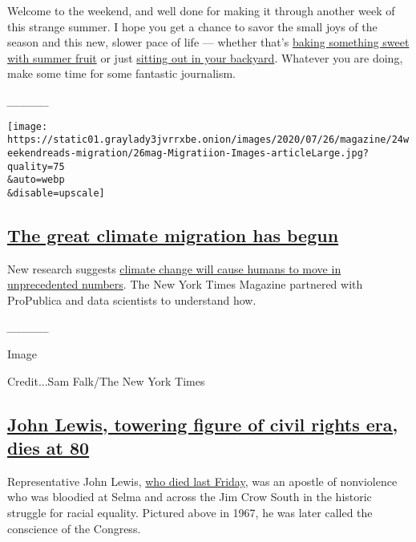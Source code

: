 Welcome to the weekend, and well done for making it through another week
of this strange summer. I hope you get a chance to savor the small joys
of the season and this new, slower pace of life --- whether that's
\href{https://cooking.nytimes3xbfgragh.onion/68861692-nyt-cooking/11666084-14-stunning-summer-fruit-desserts}{baking
something sweet with summer fruit} or just
\href{https://www.nytimes3xbfgragh.onion/interactive/2020/07/22/smarter-living/wirecutter/5-cheapish-things-to-spruce-up-your-backyard.html}{sitting
out in your backyard}. Whatever you are doing, make some time for some
fantastic journalism.

\emph{\_\_\_\_\_}

\texttt{[image: https://static01.graylady3jvrrxbe.onion/images/2020/07/26/magazine/24weekendreads-migration/26mag-Migratiion-Images-articleLarge.jpg?quality=75\\\&auto=webp\\\&disable=upscale]}

\hypertarget{the-great-climate-migration-has-begun}{%
\subsection{\texorpdfstring{\href{https://www.nytimes3xbfgragh.onion/interactive/2020/07/23/magazine/climate-migration.html}{The
great climate migration has
begun}}{The great climate migration has begun}}\label{the-great-climate-migration-has-begun}}

New research suggests
\href{https://www.nytimes3xbfgragh.onion/interactive/2020/07/23/magazine/climate-migration.html}{climate
change will cause humans to move in unprecedented numbers}. The New York
Times Magazine partnered with ProPublica and data scientists to
understand how.

\emph{\_\_\_\_\_}

Image

Credit...Sam Falk/The New York Times

\hypertarget{john-lewis-towering-figure-of-civil-rights-era-dies-at-80}{%
\subsection{\texorpdfstring{\href{https://www.nytimes3xbfgragh.onion/2020/07/17/us/john-lewis-dead.html}{John
Lewis, towering figure of civil rights era, dies at
80}}{John Lewis, towering figure of civil rights era, dies at 80}}\label{john-lewis-towering-figure-of-civil-rights-era-dies-at-80}}

Representative John Lewis,
\href{https://www.nytimes3xbfgragh.onion/2020/07/17/us/john-lewis-dead.html}{who
died last Friday}, was an apostle of nonviolence who was bloodied at
Selma and across the Jim Crow South in the historic struggle for racial
equality. Pictured above in 1967, he was later called the conscience of
the Congress.


